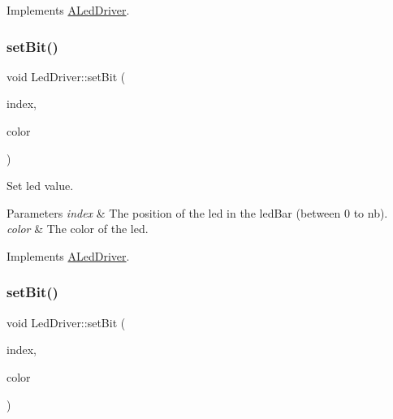 Implements \hyperlink{classALedDriver_acbc8507c36f0f4fa3afb845d81e56eb2}{A\+Led\+Driver}.

\mbox{\label{classLedDriver_a1856fb030d88bcacdc37dfce7f0f8136}} 
\subsubsection{\texorpdfstring{set\+Bit()}{setBit()}\hspace{0.1cm}{\footnotesize\ttfamily [3/5]}}
{\footnotesize\ttfamily void Led\+Driver\+::set\+Bit (\begin{DoxyParamCaption}\item[{int}]{index,  }\item[{Led\+Color}]{color }\end{DoxyParamCaption})\hspace{0.3cm}{\ttfamily [virtual]}}



Set led value. 


\begin{DoxyParams}{Parameters}
{\em index} & The position of the led in the led\+Bar (between 0 to nb). \\
\hline
{\em color} & The color of the led. \\
\hline
\end{DoxyParams}


Implements \hyperlink{classALedDriver_acbc8507c36f0f4fa3afb845d81e56eb2}{A\+Led\+Driver}.

\mbox{\label{classLedDriver_a1856fb030d88bcacdc37dfce7f0f8136}} 
\subsubsection{\texorpdfstring{set\+Bit()}{setBit()}\hspace{0.1cm}{\footnotesize\ttfamily [4/5]}}
{\footnotesize\ttfamily void Led\+Driver\+::set\+Bit (\begin{DoxyParamCaption}\item[{int}]{index,  }\item[{Led\+Color}]{color }\end{DoxyParamCaption})\hspace{0.3cm}{\ttfamily [virtual]}}



